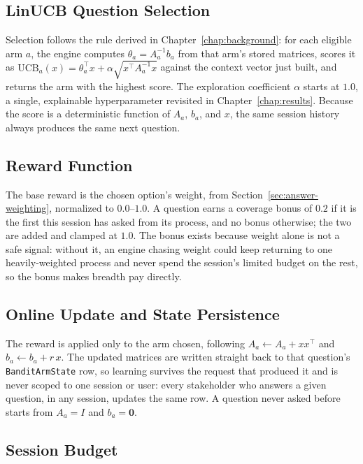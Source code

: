 \documentclass[a4paper, 12pt, oneside, openany, BCOR1cm,toc=chapterentrywithdots]{scrbook}
\begin{document}
\subsection{LinUCB Question Selection}

Selection follows the rule derived in Chapter~\ref{chap:background}: for each eligible arm $a$,
the engine computes $\theta_a = A_a^{-1} b_a$ from that arm's stored matrices, scores it as
$\mathrm{UCB}_a(x) = \theta_a^\top x + \alpha \sqrt{x^\top A_a^{-1} x}$ against the context vector
just built, and returns the arm with the highest score. The exploration coefficient $\alpha$
starts at $1.0$, a single, explainable hyperparameter revisited in Chapter~\ref{chap:results}.
Because the score is a deterministic function of $A_a$, $b_a$, and $x$, the same session history
always produces the same next question.

\subsection{Reward Function}

The base reward is the chosen option's weight, from Section~\ref{sec:answer-weighting},
normalized to $0.0$--$1.0$. A question earns a coverage bonus of $0.2$ if it is the first this
session has asked from its process, and no bonus otherwise; the two are added and clamped at
$1.0$. The bonus exists because weight alone is not a safe signal: without it, an engine chasing
weight could keep returning to one heavily-weighted process and never spend the session's limited
budget on the rest, so the bonus makes breadth pay directly.

\subsection{Online Update and State Persistence}

The reward is applied only to the arm chosen, following $A_a \leftarrow A_a + x x^\top$ and
$b_a \leftarrow b_a + r\,x$. The updated matrices are written straight back to that question's
\texttt{BanditArmState} row, so learning survives the request that produced it and is never
scoped to one session or user: every stakeholder who answers a given question, in any session,
updates the same row. A question never asked before starts from $A_a = I$ and $b_a = \mathbf{0}$.

\subsection{Session Budget}
\end{document}
